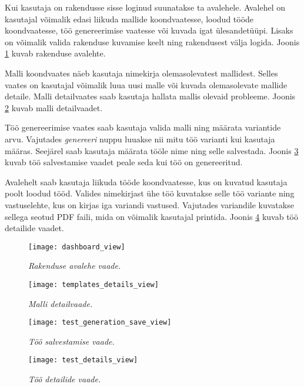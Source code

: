 Kui kasutaja on rakendusse sisse loginud suunatakse ta avalehele. Avalehel on kasutajal võimalik edasi liikuda mallide koondvaatesse, loodud tööde koondvaatesse, töö genereerimise vaatesse või kuvada igat ülesandetüüpi. Lisaks on võimalik valida rakenduse kuvamise keelt ning rakendusest välja logida. Joonis \ref{fig:dashboard-view} kuvab rakenduse avalehte.

Malli koondvaates näeb kasutaja nimekirja olemasolevatest mallidest. Selles vaates on kasutajal võimalik luua uusi malle või kuvada olemasolevate mallide detaile. Malli detailvaates saab kasutaja hallata mallis olevaid probleeme. Joonis \ref{fig:template-details-view} kuvab malli detailvaadet.

Töö genereerimise vaates saab kasutaja valida malli ning määrata variantide arvu. Vajutades \textit{genereeri} nuppu luuakse nii mitu töö varianti kui kasutaja määras. Seejärel saab kasutaja määrata tööle nime ning selle salvestada. Joonis \ref{fig:test-generation-save-view} kuvab töö salvestamise vaadet peale seda kui töö on genereeritud.

Avalehelt saab kasutaja liikuda tööde koondvaatesse, kus on kuvatud kasutaja poolt loodud tööd. Valides nimekirjast ühe töö kuvatakse selle töö variante ning vastuselehte, kus on kirjas iga variandi vastused. Vajutades variandile kuvatakse sellega seotud PDF faili, mida on võimalik kasutajal printida. Joonis \ref{fig:test-details-view} kuvab töö detailide vaadet.

\begin{figure}[H]
    \centering
    \texttt{[image: dashboard\_view]}
    \caption{\emph{Rakenduse avalehe vaade.}}
    \label{fig:dashboard-view}
\end{figure}

\begin{figure}[H]
    \centering
    \texttt{[image: templates\_details\_view]}
    \caption{\emph{Malli detailvaade.}}
    \label{fig:template-details-view}
\end{figure}

\begin{figure}[H]
    \centering
    \texttt{[image: test\_generation\_save\_view]}
    \caption{\emph{Töö salvestamise vaade.}}
    \label{fig:test-generation-save-view}
\end{figure}

\begin{figure}[H]
    \centering
    \texttt{[image: test\_details\_view]}
    \caption{\emph{Töö detailide vaade.}}
    \label{fig:test-details-view}
\end{figure}

